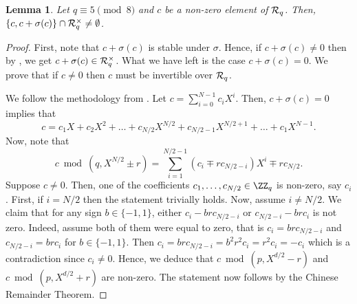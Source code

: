 \documentclass[11pt,letterpaper]{article}
\newcounter{theo}[section]
\newtheorem{lemma}[theorem]{Lemma}
\theoremstyle{definition} %
\begin{document}
\begin{lemma}
Let $q \equiv 5 \pmod{8}$ and $c$ be a non-zero element of $\mathcal{R}_q$. Then, $\{c,c+\sigma(c)\} \cap \mathcal{R}_q^\times \neq \emptyset$.   
\end{lemma}
\begin{proof}
 First, note that $c+\sigma(c)$ is stable under $\sigma$. Hence, if $c+\sigma(c) \neq 0$ then by \cite[Lemma 2.6]{DBLP:conf/crypto/LyubashevskyNP22}, we get $c+ \sigma(c) \in \mathcal{R}_q^\times$. What we have left is the case $c + \sigma(c) = 0$. We prove that if $c \neq 0$ then $c$ must be invertible over $\mathcal{R}_q$.

 We follow the methodology from \cite[Lemma 2.6]{DBLP:conf/crypto/LyubashevskyNP22}. Let $c = \sum^{N-1}_{i=0} c_i X^i$. Then, $c + \sigma(c) = 0$ implies that
 \[ c = c_1X + c_2X^2 + \ldots + c_{N/2}X^{N/2} + c_{N/2-1}X^{N/2+1} + \ldots + c_1X^{N-1}.\]
 Now, note that
\[c \bmod (q,X^{N/2}\pm r) = \sum^{N/2-1}_{i=1} (c_i \mp rc_{N/2-i})X^i \mp rc_{N/2}.\]
Suppose $c \neq 0$. Then, one of the coefficients $c_1,\ldots,c_{N/2} \in \ZZ_q$ is non-zero, say $c_i$. First, if $i = N/2$ then the statement trivially holds. Now, assume $i \neq N/2$. We claim that for any sign $b\in \{-1,1\}$, either $c_i  - brc_{N/2-i}$ or $c_{N/2-i} - brc_{i}$ is not zero. Indeed, assume both of them were equal to zero, that is $c_i =  brc_{N/2-i}$ and $c_{N/2-i} = brc_{i}$ for $b \in \{-1,1\}$. Then $c_i = b rc_{N/2-i} = b^2r^2c_i =r^2c_i =  -c_i $ which is a contradiction since $c_i \neq 0$. Hence, we deduce that $c \bmod (p,X^{d/2}- r)$ and $c \bmod (p,X^{d/2} + r)$ are non-zero. The statement now follows by the Chinese Remainder Theorem.
\end{proof}
\end{document}
